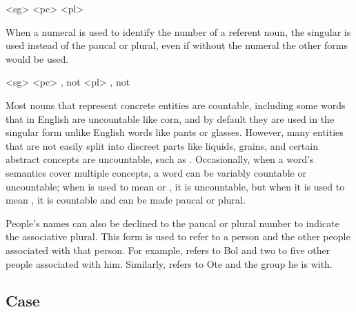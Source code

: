 	\a<sg>     
	\a<pc>     
	\a<pl>     
\xe

When a numeral is used to identify the number of a referent noun, the singular is used instead of the paucal or plural, even if without the numeral the other forms would be used\autocite{wals-34}.

	\a<sg>     
	\a<pc>     , not  
	\a<pl>     , not  
\xe

Most nouns that represent concrete entities are countable, including some words that in English are uncountable like corn, and by default they are used in the singular form unlike English words like pants or glasses. However, many entities that are not easily split into discreet parts like liquids, grains, and certain abstract concepts are uncountable, such as    . Occasionally, when a word's semantics cover multiple concepts, a word can be variably countable or uncountable; when    is used to mean  or , it is uncountable, but when it is used to mean , it is countable and can be made paucal or plural.

People's names can also be declined to the paucal or plural number to indicate the associative plural\autocite{wals-36}. This form is used to refer to a person and the other people associated with that person. For example,     refers to Bol and two to five other people associated with him. Similarly,     refers to Ote and the group he is with.

\subsection{Case}
\label{subsec:tvk-nouns-case}

